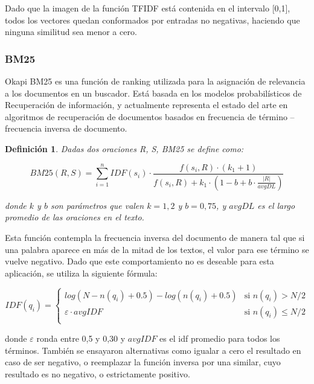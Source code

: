 \documentclass{llncs}
\newtheorem{definicion}{Definición}
\begin{document}
Dado que la imagen de la función TFIDF está contenida en el intervalo [0,1], todos los vectores quedan conformados por entradas no negativas, haciendo que ninguna similitud sea menor a cero. 


\subsubsection{BM25}
Okapi BM25 es una función de ranking utilizada para la asignación de relevancia a los documentos en un buscador. 
Está basada en los modelos probabilísticos de Recuperación de información, y actualmente 
representa el estado del arte en algoritmos de recuperación de documentos 
basados en frecuencia de término -- frecuencia inversa de documento.

\begin{definicion}
Dadas dos oraciones R, S, BM25 se define como:

\begin{equation}
BM25(R,S) = \sum_{i=1}^{n} IDF(s_i) \cdot \frac{f(s_i, R) \cdot (k_1 + 1)}{f(s_i, R) + k_1 \cdot (1 - b + b \cdot \frac{|R|}{avgDL})}
\end{equation}

donde $k$ y $b$ son parámetros que valen $k = 1,2$ y $b = 0,75$, y $avgDL$ es el largo promedio de las oraciones en el texto.
\end{definicion}

Esta función contempla la frecuencia inversa del documento de manera tal que si una palabra aparece en más de la mitad de los textos, el valor para ese término se vuelve negativo. Dado que este comportamiento no es deseable para esta aplicación, se utiliza la siguiente fórmula:
                
\begin{equation}
 IDF(q_i) =
  \begin{cases}
       log(N - n(q_i) + 0.5) - log(n(q_i) + 0.5)    & \text{si }  n(q_i) > N/2\\
       \varepsilon \cdot avgIDF                     & \text{si }  n(q_i) \leq N/2\\
  \end{cases}
\end{equation}                
                
donde $\varepsilon$ ronda entre 0,5 y 0,30 y $avgIDF$ es el idf promedio para todos los términos.
También se ensayaron alternativas como igualar a cero el resultado en caso de ser negativo, o reemplazar la función inversa por una similar, cuyo resultado es no negativo, o estrictamente positivo. 
\end{document}

